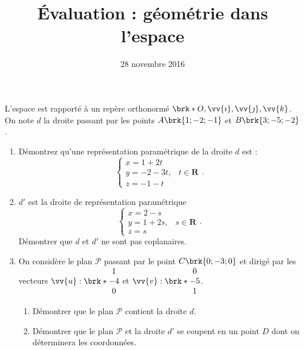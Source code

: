 \documentclass[12pt,a4paper,french]{article}
\title{Évaluation \no 4 : géométrie dans l'espace}
\author{\bsc{Ts 3}}
\date{28 novembre 2016}
\makeatletter
\renewcommand{\maketitle}%
{\framebox{%
    \begin{minipage}{1.0\linewidth}%
      \begin{center}%
        \Large \@title ~-- \@author \\%
        \@date%
      \end{center}%
    \end{minipage}}%
  \normalsize%
}
\theoremstyle{break}
\theoremstyle{plain}
\theoremstyle{nonumberplain}
\theoremstyle{nonumberbreak}
\makeatother
\begin{document}
\maketitle

\begin{question}
  L'espace est rapporté à un repère orthonormé $\brk*{O, \vv{\imath},
  \vv{\jmath}, \vv{k}}$. On note $d$ la droite passant par les points
  $A \brk{1;-2;-1}$ et $B \brk{3;-5;-2}$.

  \begin{enumerate}
    \item Démontrez qu'une représentation paramétrique de la droite
      $d$ est : \[ \left\lbrace\begin{array}{lr} x = 1 + 2t & \\ y =
    -2 -3t, & t\in \mathbf{R} \\ z = -1 -t \end{array}\right. . \]
    \item $d'$ est la droite de représentation paramétrique \[
        \left\lbrace\begin{array}{lr} x = 2 - s & \\ y = 1 + 2s, &
      s\in \mathbf{R} \\ z = s \end{array}\right. . \] Démontrer que
      $d$ et $d'$ ne sont pas coplanaires.
    \item On considère le plan $\mathscr{P}$ passant par le point $C
      \brk{0;-3;0}$ et dirigé par les vecteurs $\vv{u} : \brk*{
      \begin{matrix} 1 \\ -4 \\ 0 \end{matrix}}$ et $\vv{v}  : \brk*{
      \begin{matrix} 0 \\ -5 \\ 1 \end{matrix}}$.

      \begin{enumerate}
        \item Démontrer que le plan $\mathscr{P}$ contient la droite
          $d$.
        \item Démontrer que le plan $\mathscr{P}$ et la droite $d'$ se
          coupent en un point $D$ dont on déterminera les coordonnées.
      \end{enumerate}
  \end{enumerate}
\end{question}


\pagebreak
\printsolutions
\end{document}
